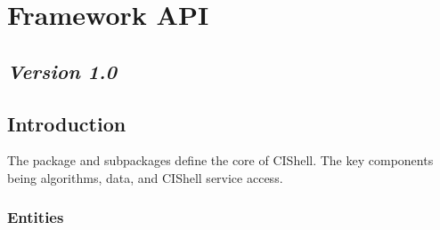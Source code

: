 %

\chapter{Framework API}

\section*{\textit{Version 1.0}}

\section{Introduction}

The  package and subpackages define the core of
CIShell. The key components being algorithms, data, and CIShell service access.

\subsection{Entities}

